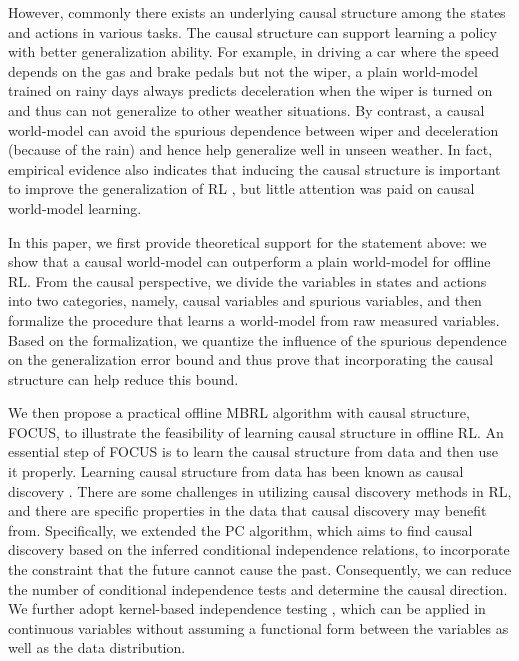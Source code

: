 \documentclass{article}
\theoremstyle{plain}
\theoremstyle{definition}
\theoremstyle{remark}
\begin{document}
However, commonly there exists an underlying causal structure among the states and actions in various tasks.
The causal structure can support learning a policy with better generalization ability.
For example, in driving a car where the speed depends on the gas and brake pedals but not the wiper,
a plain world-model trained on rainy days always predicts deceleration when the wiper is turned on and thus can not generalize to other weather situations.
By contrast, a causal world-model can avoid the spurious dependence between wiper and deceleration (because of the rain) and hence help generalize well in unseen weather.
In fact, empirical evidence also indicates that inducing the causal structure is important to improve the generalization of RL \cite{DBLP:conf/cogsci/EdmondsKSZRZL18, DBLP:conf/atal/Tenenbaum18,DBLP:conf/iclr/BengioDRKLBGP20,DBLP:conf/nips/HaanJL19,zhu.aaai22}, but little attention was paid on causal world-model learning.


In this paper, we first provide theoretical support for the statement above: we show that a causal world-model can outperform a plain world-model for offline RL.
From the causal perspective, we divide the variables in states and actions into two categories, namely, causal variables and spurious variables, and then formalize the procedure that learns a world-model from raw measured variables.
Based on the formalization, we quantize the influence of the spurious dependence on the generalization error bound and thus prove that incorporating the causal structure can help reduce this bound.

We then propose a practical offline MBRL algorithm with causal structure, FOCUS, to illustrate the feasibility of learning causal structure in offline RL.
An essential step of FOCUS is to learn the causal structure from data and then use it properly. Learning causal structure from data has been known as causal discovery \cite{spirtes2000causation}.
There are some challenges in utilizing causal discovery methods in RL, and there are specific properties in the data that causal discovery may benefit from. %
Specifically, we extended the PC algorithm, which aims to find causal discovery based on the inferred conditional independence relations, to incorporate the constraint that the future cannot cause the past. Consequently, we can reduce the number of conditional independence tests and determine the causal direction.
We further adopt kernel-based independence testing \cite{kci}, which can be applied in continuous variables without assuming a functional form between the variables as well as the data distribution.
\end{document}
